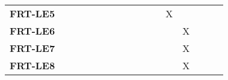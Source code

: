 \documentclass[12pt, titlepage]{article}
\begin{document}
\begin{landscape}
\begin{longtable}{|l|ccccccccccc|}
		\textbf{FRT-LE5} & ~                                                         & ~             & ~             & ~             & ~             & ~             & ~             & X             & ~             & ~             & ~\\
		\textbf{FRT-LE6} & ~                                                         & ~             & ~             & ~             & ~             & ~             & ~             & ~             & X             & ~             & ~\\
		\textbf{FRT-LE7} & ~                                                         & ~             & ~             & ~             & ~             & ~             & ~             & ~             & X             & ~             & ~\\
		\textbf{FRT-LE8} & ~                                                         & ~             & ~             & ~             & ~             & ~             & ~             & ~             & X             & ~             & ~\\
		\hline
	\end{longtable}

	\newpage
	

\end{landscape}
\end{document}

